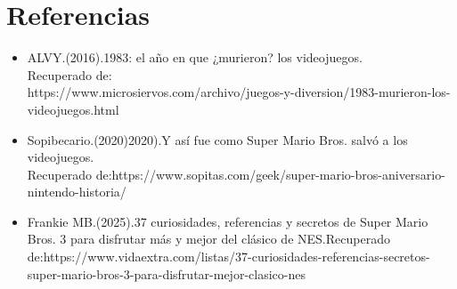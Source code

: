\documentclass{article}
\begin{document}
\section{Referencias}

\begin{itemize}
    \item ALVY.(2016).1983: el año en que ¿murieron? los videojuegos.
    \\Recuperado de:\\https://www.microsiervos.com/archivo/juegos-y-diversion/1983-murieron-los-videojuegos.html
    \item Sopibecario.(2020)2020).Y así fue como Super Mario Bros. salvó a los videojuegos.\\Recuperado de:https://www.sopitas.com/geek/super-mario-bros-aniversario-nintendo-historia/
    \item Frankie MB.(2025).37 curiosidades, referencias y secretos de Super Mario Bros. 3 para disfrutar más y mejor del clásico de NES.Recuperado de:https://www.vidaextra.com/listas/37-curiosidades-referencias-secretos-super-mario-bros-3-para-disfrutar-mejor-clasico-nes
\end{itemize}
\end{document}
